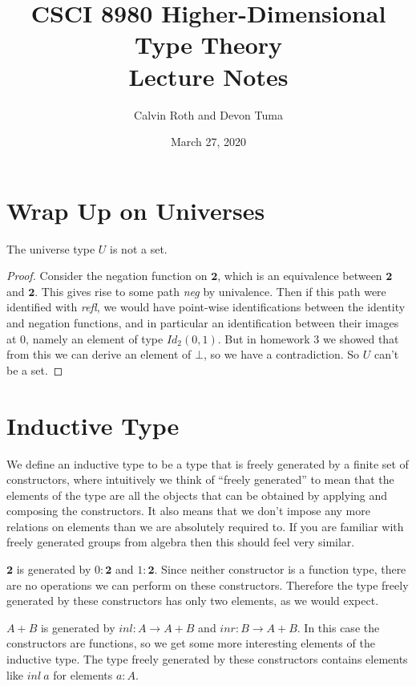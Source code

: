 \documentclass[11pt]{article}
\title{CSCI 8980 Higher-Dimensional Type Theory\\ Lecture Notes}
\author{Calvin Roth and Devon Tuma}
\date{March 27, 2020}
\newcommand{\2}{\textbf{2}}
\begin{document}
\maketitle

\section{Wrap Up on Universes}

\begin{theorem}
The universe type $U$ is not a set. 
\end{theorem}
\begin{proof}
Consider the negation function on $\2$, which is an equivalence between $\2$ and $\2$.
This gives rise to some path \textit{neg} by univalence. 
Then if this path were identified with \textit{refl}, we would have point-wise identifications between the identity and negation functions, and in particular an identification between their images at $0$, namely an element of type $Id_2(0,1)$.
But in homework $3$ we showed that from this we can derive an element of $\bot$, so we have a contradiction.
So $U$ can't be a set.
\end{proof}

\section{Inductive Type}
We define an inductive type to be a type that is freely generated by a finite set of constructors, where intuitively we think of ``freely generated'' to mean that the elements of the type are all the objects that can be obtained by applying and composing the constructors. It also means that we don't impose any more relations on elements than we are absolutely required to. If you are familiar with freely generated groups from algebra then this should feel very similar.

\begin{example}
  $\2$ is generated by $0 : \2$ and $1 : \2$. Since neither constructor is a function type, there are no operations we can perform on these constructors. Therefore the type freely generated by these constructors has only two elements, as we would expect.
\end{example}

\begin{example}
  $A + B$ is generated by $inl : A \to A + B$ and $inr : B \to A + B$. In this case the constructors are functions, so we get some more interesting elements of the inductive type. The type freely generated by these constructors contains elements like $inl\ a$ for elements $a : A$. 
\end{example}
    
\end{document}

